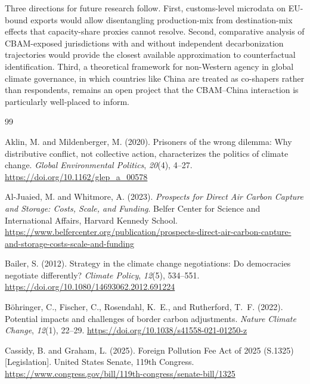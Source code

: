 \documentclass[letterpaper, 10pt, conference]{ieeeconf}
\begin{document}
Three directions for future research follow. First, customs-level
microdata on EU-bound exports would allow disentangling
production-mix from destination-mix effects that capacity-share
proxies cannot resolve. Second, comparative analysis of CBAM-exposed
jurisdictions with and without independent decarbonization
trajectories would provide the closest available approximation to
counterfactual identification. Third, a theoretical framework for
non-Western agency in global climate governance, in which countries
like China are treated as co-shapers rather than respondents, remains
an open project that the CBAM--China interaction is particularly
well-placed to inform.



\begin{thebibliography}{99}

Aklin, M. and Mildenberger, M. (2020).
Prisoners of the wrong dilemma: Why distributive conflict, not collective action, characterizes the politics of climate change.
\textit{Global Environmental Politics}, \textit{20}(4), 4--27.
\url{https://doi.org/10.1162/glep_a_00578}

Al-Juaied, M. and Whitmore, A. (2023).
\textit{Prospects for Direct Air Carbon Capture and Storage: Costs, Scale, and Funding}.
Belfer Center for Science and International Affairs, Harvard Kennedy School.
\url{https://www.belfercenter.org/publication/prospects-direct-air-carbon-capture-and-storage-costs-scale-and-funding}

Bailer, S. (2012).
Strategy in the climate change negotiations: Do democracies negotiate differently?
\textit{Climate Policy}, \textit{12}(5), 534--551.
\url{https://doi.org/10.1080/14693062.2012.691224}

B\"{o}hringer, C., Fischer, C., Rosendahl, K.~E., and Rutherford, T.~F. (2022).
Potential impacts and challenges of border carbon adjustments.
\textit{Nature Climate Change}, \textit{12}(1), 22--29.
\url{https://doi.org/10.1038/s41558-021-01250-z}

Cassidy, B. and Graham, L. (2025).
Foreign Pollution Fee Act of 2025 (S.1325) [Legislation].
United States Senate, 119th Congress.
\url{https://www.congress.gov/bill/119th-congress/senate-bill/1325}


\end{thebibliography}
\end{document}

